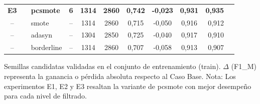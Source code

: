 \documentclass{article}
\begin{document}
\begin{table}[ht]
\begin{minipage}{\textwidth}
\begin{tabular}{cllccccccrc}
            \textbf{E3} &  & \textbf{pcsmote} & \textbf{6} & \textbf{1314} & \textbf{2860} & \textbf{0,742} & \textbf{-0,023} & \textbf{0,931} & \textbf{0,935} \\
            -- & & smote & -- & 1314 & 2860 & 0,715 & -0,050 & 0,916 & 0,912 \\
            -- & & adasyn & -- & 1304 & 2850 & 0,725 & -0,040 & 0,917 & 0,910 \\
            -- & & borderline & -- & 1314 & 2860 & 0,707 & -0,058 & 0,913 & 0,907 \\
            \bottomrule
        \end{tabular}
        \vspace{1mm}
        \begin{flushleft}
            \footnotesize * Semillas candidatas validadas en el conjunto de entrenamiento (train). $\Delta$ (F1\_M) representa la ganancia o pérdida absoluta respecto al Caso Base. Nota: Los experimentos E1, E2 y E3 resaltan la variante de pcsmote con mejor desempeño para cada nivel de filtrado.
        \end{flushleft}
    \end{minipage}
\end{table}
\end{document}
